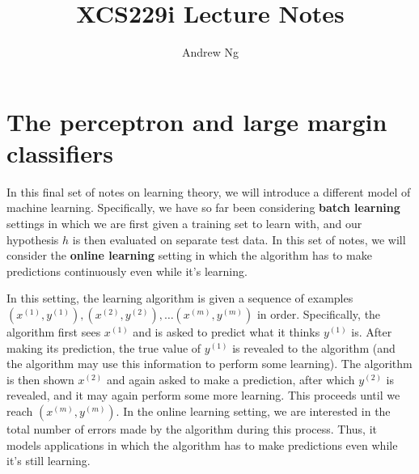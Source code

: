 \documentclass{article}
\begin{document}
\title{XCS229i Lecture Notes}
\author{Andrew Ng}
\date{}
\maketitle


\noindent

\def\qed {\hfill\hbox{{\vspace{0.01in} \large $\Box$}}}



\section{The perceptron and large margin classifiers}

%

In this final set of notes on learning theory, we will introduce
a different model of machine learning.  Specifically, we have so
far been considering {\bf batch learning} settings in which we are
first given a training set to learn with, and our hypothesis $h$ 
is then evaluated on separate test data.  In this set of notes, we will 
consider the {\bf online learning} setting in which the algorithm
has to make predictions continuously even while it's learning.

In this setting, the learning algorithm 
is given a sequence of examples 
$(x^{(1)}, y^{(1)}), (x^{(2)}, y^{(2)}),  \ldots (x^{(m)}, y^{(m)})$ 
in order.  
Specifically, the algorithm first sees $x^{(1)}$ and is asked to predict 
what it thinks $y^{(1)}$ is. 
After making its prediction, the true value of $y^{(1)}$ is revealed 
to the algorithm (and the algorithm may use this information to perform
some learning).  The algorithm is then shown $x^{(2)}$ and
again asked to make a prediction, after which $y^{(2)}$ is revealed, 
and it may again 
perform some more learning.  This proceeds until we reach $(x^{(m)}, y^{(m)})$.  
In the online learning setting, we are interested in the total number of 
errors made by the algorithm during this process.  Thus, it models 
applications in which the algorithm has to make predictions even while it's
still learning. 
\end{document}
